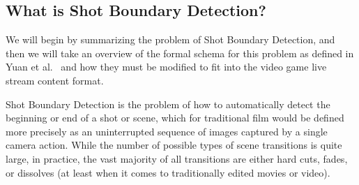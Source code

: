 \documentclass[12pt]{article}
\begin{document}
\subsection{What is Shot Boundary Detection?}
We will begin by summarizing the problem of Shot Boundary Detection, and then we will take an overview of the formal schema for this problem as defined in Yuan et al.~\cite{survey1}
and how they must be modified to fit into the video game live stream content format.

Shot Boundary Detection is the problem of how to automatically detect the beginning or end of a shot or scene, which for traditional 
film would be defined more precisely as an uninterrupted sequence of images captured by a single camera action. 
While the number of possible types of scene transitions is quite large, in practice, the vast majority of all transitions are either hard cuts, fades,
or dissolves (at least when it comes to traditionally edited movies or video). 
\end{document}
